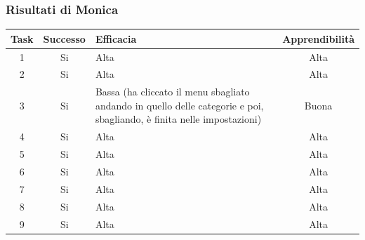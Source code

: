\documentclass[../Report.tex]{subfiles}
\begin{document}
    \subsubsection{Risultati di Monica}
    \begin{table}[H]
        \begin{tabular}{|c|c|p{5cm}|c|}
            \hline
            Task & Successo & Efficacia & Apprendibilità \\
            \hline
            1 & Si & Alta & Alta \\
            \hline
            2 & Si & Alta & Alta  \\
            \hline
            3 & Si & Bassa (ha cliccato il menu sbagliato andando in quello delle categorie e poi, sbagliando, è finita nelle impostazioni)  & Buona  \\
            \hline
            4 & Si & Alta & Alta  \\
            \hline
            5 & Si & Alta & Alta  \\
            \hline
            6 & Si & Alta & Alta  \\
            \hline
            7 & Si & Alta & Alta  \\
            \hline
            8 & Si & Alta & Alta  \\
            \hline
            9 & Si & Alta & Alta  \\
            \hline
        \end{tabular}

        
    \end{table}
\end{document}
